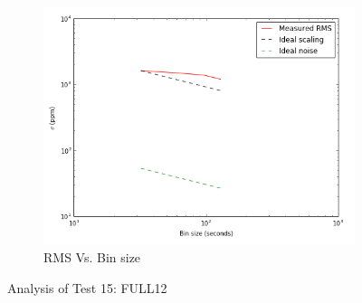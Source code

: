 \documentclass[conference]{IEEEtran}
\begin{document}
\begin{figure}[H]
    \begin{subfigure}{3}
        \includegraphics[scale=0.6]{rms_test15}
        \caption{RMS Vs. Bin size}
    \end{subfigure}
    \caption{Analysis of Test 15: FULL12}
\end{figure}
\end{document}
